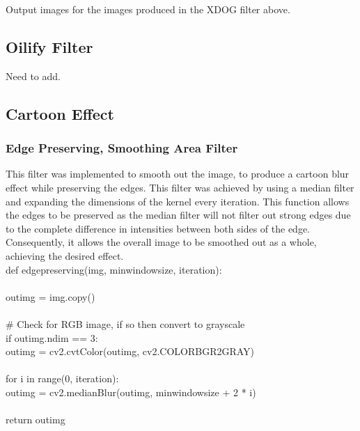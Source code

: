 \documentclass{article}
\begin{document}
	Output images for the images produced in the XDOG filter above.\\
	
%		
%		
	
	\subsection{Oilify Filter}
	
	Need to add.
	
	\subsection{Cartoon Effect}
	
	\subsubsection{Edge Preserving, Smoothing Area Filter}
	
	This filter was implemented to smooth out the image, to produce a cartoon blur effect while preserving the edges. This filter was achieved by using a median filter and expanding the dimensions of the kernel every iteration. This function allows the edges to be preserved as the median filter will not filter out strong edges due to the complete difference in intensities between both sides of the edge. Consequently, it allows the overall image to be smoothed out as a whole, achieving the desired effect.\\
	
	\noindent def edge\textunderscore preserving(img, min\textunderscore window\textunderscore size, iteration):\\
	\\
	\indent out\textunderscore img = img.copy()\\
	\\
	\indent \#     Check for RGB image, if so then convert to grayscale\\
	\indent if out\textunderscore img.ndim == 3:   \\      
	\indent \indent out\textunderscore img = cv2.cvtColor(out\textunderscore img, cv2.COLOR\textunderscore BGR2GRAY)\\
	\\
	\indent for i in range(0, iteration):\\
	\indent \indent out\textunderscore img = cv2.medianBlur(out\textunderscore img, min\textunderscore window\textunderscore size + 2 * i)\\
	\\
	\indent return out\textunderscore img\\
	
\end{document}
